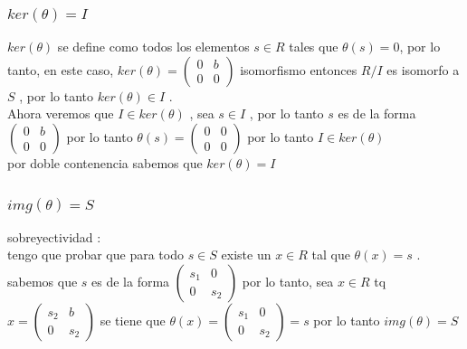 \documentclass[10pt,a4paper]{article} %
\begin{document}
            \subsubsection{$ ker(\theta ) = I  $ }
            $ ker(\theta )  $ se define como todos los elementos $ s \in R  $
            tales que $ \theta (s) = 0  $, por lo tanto, en este caso, $ ker(\theta ) = \begin{pmatrix}
                0 & b
                \\
                0 & 0
            \end{pmatrix}
              $
                isomorfismo entonces $ R/I   $ es isomorfo a $ S  $ , por lo
                tanto $ ker(\theta ) \in I  $ .
                \\
                Ahora veremos que $ I \in ker(\theta )  $  , sea $ s \in  I  $  , por lo tanto $ s  $ es de la forma $ \begin{pmatrix}
                    0 & b
                    \\
                    0 & 0
                \end{pmatrix}
                $ por lo tanto $ \theta (s) = \begin{pmatrix}
                    0& 0
                    \\
                    0 & 0
                \end{pmatrix}
                $ por lo tanto $ I \in ker(\theta )  $
                \\
                por doble contenencia sabemos que $ ker(\theta ) = I  $

            \subsubsection{ $ img(\theta )  = S  $ }
                sobreyectividad :
                \\
                tengo que probar que para todo $ s \in S  $ existe un $ x \in R
                $ tal que $ \theta (x) = s  $ .
                \\
                sabemos que $ s   $ es de la forma $ \begin{pmatrix}
                    s_1 & 0
                    \\
                    0 & s_2
                \end{pmatrix}
                  $
                  por lo tanto, sea $ x \in R   $ tq $ x = \begin{pmatrix}
                      s_2 & b
                      \\
                      0 & s_2
                  \end{pmatrix}
                  $ se tiene que $ \theta (x) = \begin{pmatrix}
                      s_1 & 0
                      \\
                      0 & s_2
                  \end{pmatrix}
                  = s  $  por lo tanto $ img(\theta ) = S  $
\end{document}
